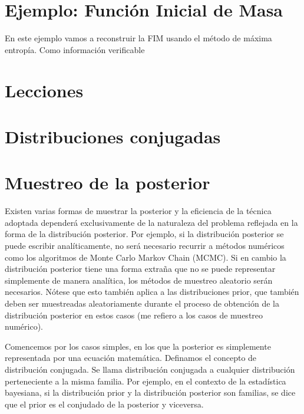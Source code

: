 \documentclass[a4paper,twoside]{article}
\begin{document}

\section{Ejemplo: Función Inicial de Masa}

En este ejemplo vamos a reconstruir la FIM usando el método de máxima entropía. Como información
verificable


\section{Lecciones}

\appendix

\section{Distribuciones conjugadas}\label{sc:conjugate-pdf}


\section{Muestreo de la posterior}

Existen varias formas de muestrar la posterior y la eficiencia de la técnica adoptada dependerá
exclusivamente de la naturaleza del problema reflejada en la forma de la distribución posterior. Por
ejemplo, si la distribución posterior se puede escribir analíticamente, no será necesario recurrir a
métodos numéricos como los algoritmos de Monte Carlo Markov Chain (MCMC). Si en cambio la
distribución posterior tiene una forma extraña que no se puede representar simplemente de manera
analítica, los métodos de muestreo aleatorio serán necesarios. Nótese que esto también aplica a las
distribuciones prior, que también deben ser muestreadas aleatoriamente durante el proceso de
obtención de la distribución posterior en estos casos (me refiero a los casos de muestreo numérico).

Comencemos por los casos simples, en los que la posterior es simplemente representada por una
ecuación matemática. Definamos el concepto de distribución conjugada. Se llama distribución
conjugada a cualquier distribución perteneciente a la misma familia. Por ejemplo, en el contexto de
la estadística bayesiana, si la distribución prior y la distribución posterior son familias, se dice
que el prior es el conjudado de la posterior y viceversa.
\end{document}
